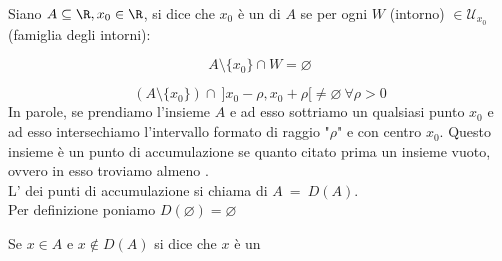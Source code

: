 \documentclass[../appunti.tex]{subfiles}
\begin{document}
\begin{defn}
	Siano $ \acr, x_0 \in \R $, si dice che $x_0$ è un 
	 di $A$ se per ogni $W$ (intorno) $\in 
	\mathcal{U}_{x_0}$ (famiglia degli intorni):
	

	\begin{equation}
		A \setminus \{ x_0 \} \cap W = \varnothing
	\end{equation}
	\bda


	\begin{equation}
		(A \setminus \{ x_0 \} ) \cap\ ] x_0 - \rho, x_0 + \rho [
		\neq \varnothing\ \forall \rho > 0
	\end{equation}
In parole, se prendiamo l'insieme $A$ e ad esso sottriamo un qualsiasi punto $x_0$
e ad esso intersechiamo l'intervallo formato di raggio 
 "$\rho$" e con centro $x_0$. 
Questo insieme è un punto di accumulazione se quanto citato prima
 un insieme vuoto, ovvero in esso troviamo almeno . \\
L' dei punti di accumulazione si chiama  di $A\ =\ D(A)$.\\
Per definizione poniamo $D(\varnothing) = \varnothing$
\end{defn}
\begin{defn}
	Se $ x \in A $ e $ x \notin  D(A)$ si dice che $x$ è un 
\end{defn}
\end{document}
